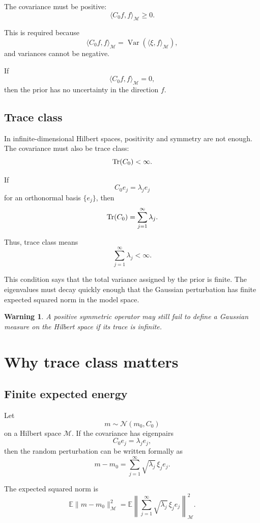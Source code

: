 \documentclass[11pt,a4paper]{book}
\newtheorem{warning}[definition]{Warning}
\newcommand{\M}{\mathcal{M}}      %
\begin{document}
The covariance must be positive:
\[
    \langle C_0 f,f\rangle_{\M} \geq 0.
\]

This is required because
\[
    \langle C_0 f,f\rangle_{\M}
    =
    \operatorname{Var}(\langle \xi,f\rangle_{\M}),
\]
and variances cannot be negative.

If
\[
    \langle C_0 f,f\rangle_{\M}=0,
\]
then the prior has no uncertainty in the direction $f$.

\subsection{Trace class}

In infinite-dimensional Hilbert spaces, positivity and symmetry are not enough.
The covariance must also be trace class:
\[
    \Tr(C_0) < \infty.
\]

If
\[
    C_0 e_j = \lambda_j e_j
\]
for an orthonormal basis $\{e_j\}$, then
\[
    \Tr(C_0)
    =
    \sum_{j=1}^{\infty}\lambda_j.
\]

Thus, trace class means
\[
    \sum_{j=1}^{\infty}\lambda_j < \infty.
\]

This condition says that the total variance assigned by the prior is finite.
The eigenvalues must decay quickly enough that the Gaussian perturbation has
finite expected squared norm in the model space.

\begin{warning}
A positive symmetric operator may still fail to define a Gaussian measure on
the Hilbert space if its trace is infinite.
\end{warning}

\section{Why trace class matters}

\subsection{Finite expected energy}

Let
\[
    m\sim\mathcal{N}(m_0,C_0)
\]
on a Hilbert space $\M$. If the covariance has eigenpairs
\[
    C_0 e_j = \lambda_j e_j,
\]
then the random perturbation can be written formally as
\[
    m-m_0
    =
    \sum_{j=1}^{\infty}
    \sqrt{\lambda_j}\,\xi_j e_j.
\]

The expected squared norm is
\[
    \mathbb{E}\|m-m_0\|_{\M}^2
    =
    \mathbb{E}
    \left\|
        \sum_{j=1}^{\infty}
        \sqrt{\lambda_j}\,\xi_j e_j
    \right\|_{\M}^2.
\]
\end{document}

